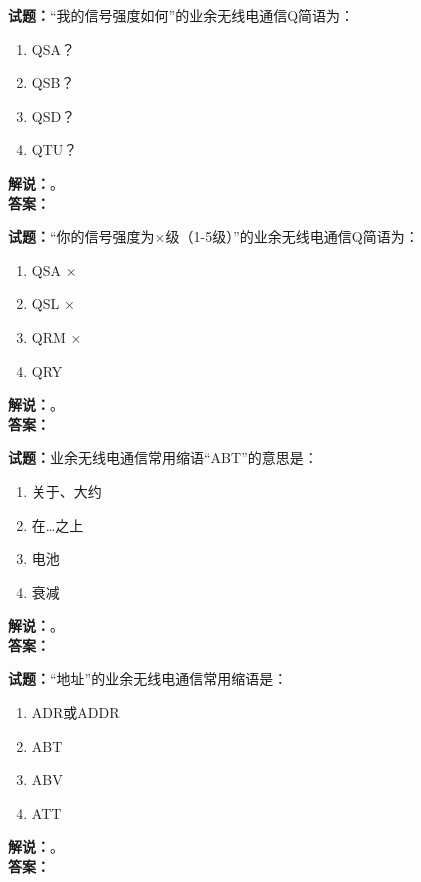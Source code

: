 \documentclass{ctexbook}
\begin{document}
\bigskip




\noindent\textbf{试题：}“我的信号强度如何”的业余无线电通信Q简语为：
\begin{enumerate}[leftmargin=3em]
\item QSA？
\item QSB？
\item QSD？
\item QTU？
\end{enumerate}
\noindent\textbf{解说：}\textbf{}。\\\noindent\textbf{答案：}

\bigskip




\noindent\textbf{试题：}“你的信号强度为×级（1-5级）”的业余无线电通信Q简语为：
\begin{enumerate}[leftmargin=3em]
\item QSA ×
\item QSL ×
\item QRM ×
\item QRY
\end{enumerate}
\noindent\textbf{解说：}\textbf{}。\\\noindent\textbf{答案：}

\bigskip




\noindent\textbf{试题：}业余无线电通信常用缩语“ABT”的意思是：
\begin{enumerate}[leftmargin=3em]
\item 关于、大约
\item 在…之上
\item 电池
\item 衰减
\end{enumerate}
\noindent\textbf{解说：}\textbf{}。\\\noindent\textbf{答案：}

\bigskip




\noindent\textbf{试题：}“地址”的业余无线电通信常用缩语是：
\begin{enumerate}[leftmargin=3em]
\item ADR或ADDR
\item ABT
\item ABV
\item ATT
\end{enumerate}
\noindent\textbf{解说：}\textbf{}。\\\noindent\textbf{答案：}

\bigskip
\end{document}
